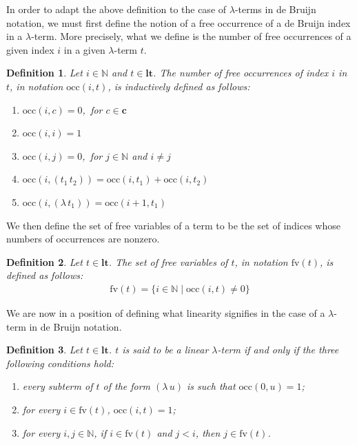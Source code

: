 \documentclass[submission,creativecommons]{eptcs}
\newtheorem{definition}{Definition}
\newcommand{\iabs}[1]{(\lambda\,#1)}
\newcommand{\iapp}[2]{(#1\,#2)}
\newcommand{\ltm}{\mathord{\mathbf{lt}}}
\newcommand{\cst}{\mathord{\mathbf{c}}}
\newcommand{\occ}[2]{\mathord{\mathrm{occ}}(#1,#2)}
\newcommand{\fv}[1]{\mathord{\mathrm{fv}}(#1)}
\begin{document}
In order to adapt the above definition to the case of $\lambda$-terms in de Bruijn notation, we must first
define the notion of a free occurrence of a de Bruijn index in a $\lambda$-term.
More precisely, what we define is the number of free occurrences of a given index $i$ in a given
$\lambda$-term $t$.

\begin{definition}
Let $i\in\mathbb{N}$ and $t\in\ltm$. The number of free occurrences of index $i$ in $t$, in notation $\occ{i}{t}$, is
inductively defined as follows:
\begin{enumerate}[label={\rm \roman*.}, labelsep*=2ex, itemsep=0pt]
\item $\occ{i}{c} = 0$,\, for $c\in\cst$
\item $\occ{i}{i} = 1$
\item $\occ{i}{j} = 0$,\, for $j\in\mathbb{N}$ and $i\not=j$
\item $\occ{i}{\iapp{t_1}{t_2}} = \occ{i}{t_1} + \occ{i}{t_2}$
\item $\occ{i}{\iabs{t_1}} = \occ{i+1}{t_1}$
\end{enumerate}
\end{definition}

We then define the set of free variables of a term to be the set of indices whose numbers of occurrences are
nonzero.
\begin{definition}
Let $t\in\ltm$. The set of free variables of $t$, in notation $\fv{t}$, is defined as follows:
\begin{align*}
\fv{t} = \{i\in\mathbb{N}\;|\;\occ{i}{t} \not= 0\}
\end{align*}
\end{definition}

We are now in a position of defining what linearity signifies in the case of a $\lambda$-term in de Bruijn
notation.

\begin{definition}\label{lltdef}
Let $t\in\ltm$. $t$ is said to be a \emph{linear $\lambda$-term} if and only if the three following conditions hold:
\begin{enumerate}[label={\rm \roman*.}, ref={\rm \roman*}, labelsep*=2ex, itemsep=0pt]
\item every subterm of $t$ of the form $\iabs{u}$ is such that $\occ{0}{u} = 1$;\label{C1}
\item for every $i\in\fv{t}$, $\occ{i}{t} = 1$;\label{C2}
\item for every $i, j \in \mathbb{N}$, if $i\in\fv{t}$ and $j<i$, then $j \in \fv{t}$.\label{C3}
\end{enumerate}
\end{definition}
\end{document}
